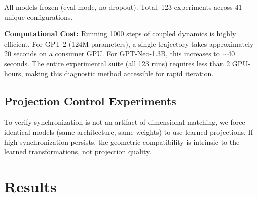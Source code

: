\documentclass[10pt]{article} %
\theoremstyle{plain}
\theoremstyle{definition}
\theoremstyle{remark}
\begin{document}
All models frozen (eval mode, no dropout). Total: 123 experiments across 41 unique configurations.

\textbf{Computational Cost:} Running 1000 steps of coupled dynamics is highly efficient. For GPT-2 (124M parameters), a single trajectory takes approximately 20 seconds on a consumer GPU. For GPT-Neo-1.3B, this increases to $\sim$40 seconds. The entire experimental suite (all 123 runs) requires less than 2 GPU-hours, making this diagnostic method accessible for rapid iteration.



\subsection{Projection Control Experiments}

To verify synchronization is not an artifact of dimensional matching, we force identical models (same architecture, same weights) to use learned projections. If high synchronization persists, the geometric compatibility is intrinsic to the learned transformations, not projection quality.

\section{Results}
\end{document}
